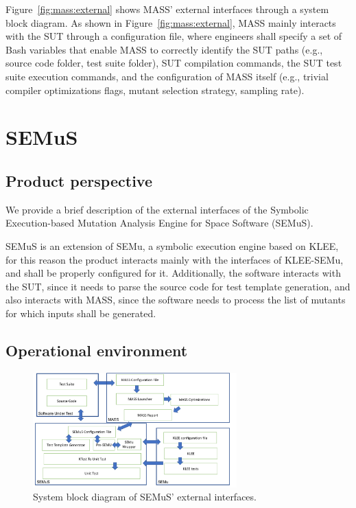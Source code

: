 Figure~\ref{fig:mass:external} shows MASS' external interfaces through a system block diagram.
As shown in Figure~\ref{fig:mass:external}, MASS mainly interacts with the SUT through a configuration file, where engineers shall specify a set of Bash variables that enable MASS to correctly identify the SUT paths (e.g., source code folder, test suite folder), SUT compilation commands, the SUT test suite execution commands, and the configuration of MASS itself (e.g., trivial compiler optimizations flags, mutant selection strategy, sampling rate).



\section{SEMuS}

\subsection{Product perspective}

We provide a brief description of the external interfaces of the Symbolic Execution-based Mutation Analysis Engine for Space Software (SEMuS).

SEMuS is an extension of SEMu, a symbolic execution engine based on KLEE, for this reason the product interacts mainly with the interfaces of KLEE-SEMu, and shall be properly configured for it. Additionally, the software interacts with the SUT, since it needs to parse the source code for test template generation, and also interacts with MASS, since the software needs to process the list of mutants for which inputs shall be generated.


\subsection{Operational environment}

\begin{figure}[t]
  \centering
  \includegraphics[width=0.7\textwidth]{images/semus-external.pdf}
      \caption{System block diagram of SEMuS' external interfaces.}
      \label{fig:semus:external}
\end{figure}

